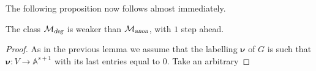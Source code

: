 The following proposition now follows almost immediately.
\begin{proposition}\label{prop:onestep}
The class $\mathcal{M}_{\textsl{deg}}$ is weaker than 
$\mathcal{M}_{\textsl{anon}}$, with $1$ step ahead.
\end{proposition}
\begin{proof}
As in the previous lemma we assume that the labelling
$\pmb{\nu}$ of $G$ is such that $\pmb{\nu}:V\to\mathbb{A}^{s+1}$ with its last entries equal to $0$. Take an arbitrary 
\end{proof}


%

%
%
%
%
%

